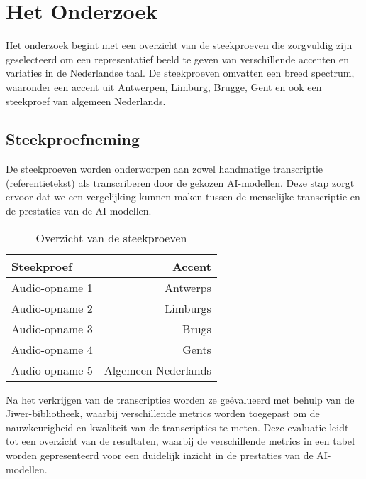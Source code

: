 
\chapter{Het Onderzoek}%
\label{ch:onderzoek}


Het onderzoek begint met een overzicht van de steekproeven die zorgvuldig zijn geselecteerd om een representatief beeld te geven van verschillende accenten en variaties in de Nederlandse taal. De steekproeven omvatten een breed spectrum, waaronder een accent uit Antwerpen, Limburg, Brugge, Gent en ook een steekproef van algemeen Nederlands.
\section{Steekproefneming}
De steekproeven worden onderworpen aan zowel handmatige transcriptie (referentietekst) als transcriberen door de gekozen AI-modellen. Deze stap zorgt ervoor dat we een vergelijking kunnen maken tussen de menselijke transcriptie en de prestaties van de AI-modellen.

\begin{table}[htbp]
    \centering
    
    \label{tab:samples}
    \begin{tabular}{l||r}
        \hline
        \toprule
        Steekproef & Accent \\ \midrule
        Audio-opname 1 & Antwerps \\
        Audio-opname 2 & Limburgs \\
        Audio-opname 3 & Brugs \\
        Audio-opname 4 & Gents \\
        Audio-opname 5 & Algemeen Nederlands \\ \bottomrule
    \end{tabular}
    \caption{Overzicht van de steekproeven}
\end{table}


Na het verkrijgen van de transcripties worden ze geëvalueerd met behulp van de Jiwer-bibliotheek, waarbij verschillende metrics worden toegepast om de nauwkeurigheid en kwaliteit van de transcripties te meten. Deze evaluatie leidt tot een overzicht van de resultaten, waarbij de verschillende metrics in een tabel worden gepresenteerd voor een duidelijk inzicht in de prestaties van de AI-modellen.

